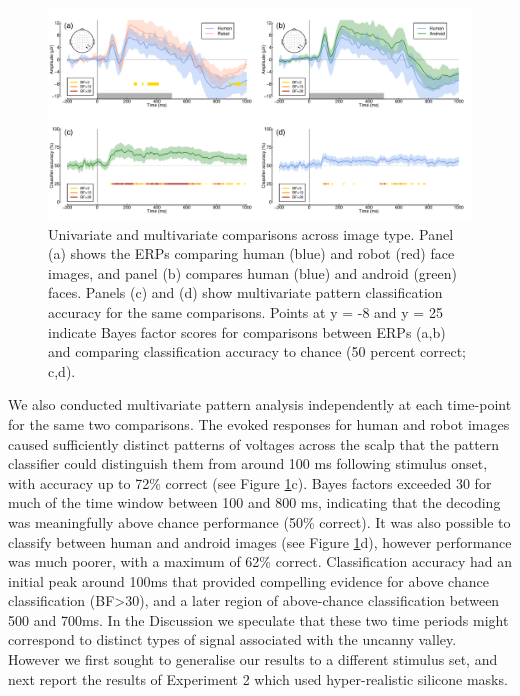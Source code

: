 \documentclass[
]{article}
\begin{document}
\begin{figure}

{\centering \includegraphics{Figures/RobotsMVPA} 

}

\caption{Univariate and multivariate comparisons across image type. Panel (a) shows the ERPs comparing human (blue) and robot (red) face images, and panel (b) compares human (blue) and android (green) faces. Panels (c) and (d) show multivariate pattern classification accuracy for the same comparisons. Points at y = -8 and y = 25 indicate Bayes factor scores for comparisons between ERPs (a,b) and comparing classification accuracy to chance (50 percent correct; c,d).}\label{fig:RobotsMVPA}
\end{figure}

We also conducted multivariate pattern analysis independently at each time-point for the same two comparisons. The evoked responses for human and robot images caused sufficiently distinct patterns of voltages across the scalp that the pattern classifier could distinguish them from around 100 ms following stimulus onset, with accuracy up to 72\% correct (see Figure \ref{fig:RobotsMVPA}c). Bayes factors exceeded 30 for much of the time window between 100 and 800 ms, indicating that the decoding was meaningfully above chance performance (50\% correct). It was also possible to classify between human and android images (see Figure \ref{fig:RobotsMVPA}d), however performance was much poorer, with a maximum of 62\% correct. Classification accuracy had an initial peak around 100ms that provided compelling evidence for above chance classification (BF\textgreater30), and a later region of above-chance classification between 500 and 700ms. In the Discussion we speculate that these two time periods might correspond to distinct types of signal associated with the uncanny valley. However we first sought to generalise our results to a different stimulus set, and next report the results of Experiment 2 which used hyper-realistic silicone masks.
\end{document}
